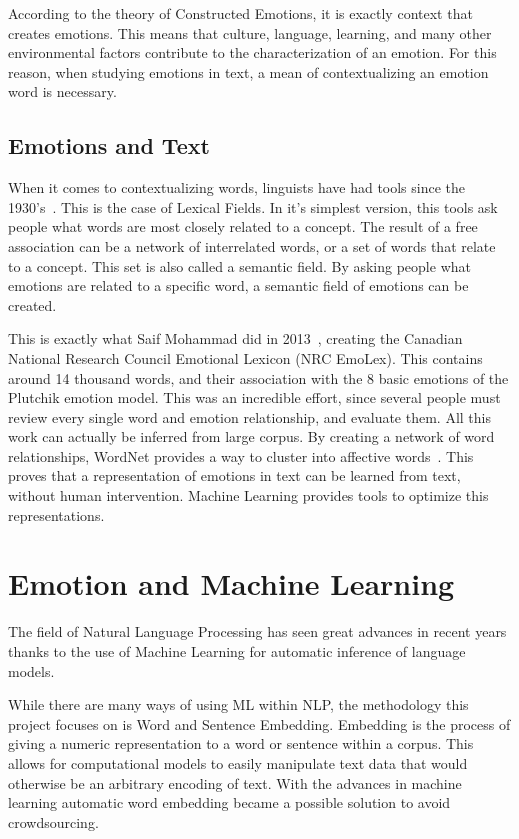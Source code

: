 According to the theory of Constructed Emotions, it is exactly context that creates emotions. This means that culture, language, learning, and many other environmental factors contribute to the characterization of an emotion. For this reason, when studying emotions in text, a mean of contextualizing an emotion word is necessary.

\subsection{Emotions and Text}\label{sub:Emotions and Text}
When it comes to contextualizing words, linguists have had tools since the 1930's~\cite{corson1996fields}. This is the case of Lexical Fields. In it's simplest version, this tools ask people what words are most closely related to a concept. The result of a free association can be a network of interrelated words, or a set of words that relate to a concept. This set is also called a semantic field.
By asking people what emotions are related to a specific word, a semantic field of emotions can be created.

This is exactly what Saif Mohammad did in 2013~\cite{mohammad2013crowdsourcing}, creating the Canadian National Research Council Emotional Lexicon (NRC EmoLex). This contains around 14 thousand words, and their association with the 8 basic emotions of the Plutchik emotion model. This was an incredible effort, since several people must review every single word and emotion relationship, and evaluate them.
All this work can actually be inferred from large corpus. By creating a network of word relationships, WordNet provides a way to cluster into affective words~\cite{strapparava2004wordnet}. This proves that a representation of emotions in text can be learned from text, without human intervention. Machine Learning provides tools to optimize this representations.

\section{Emotion and Machine Learning}\label{sec:Emotion and Machine Learning}
The field of Natural Language Processing has seen great advances in recent years thanks to the use of Machine Learning for automatic inference of language models.

While there are many ways of using ML within NLP, the methodology this project focuses on is Word and Sentence Embedding. Embedding is the process of giving a numeric representation to a word or sentence within a corpus. This allows for computational models to easily manipulate text data that would otherwise be an arbitrary encoding of text. With the advances in machine learning automatic word embedding became a possible solution to avoid crowdsourcing.

